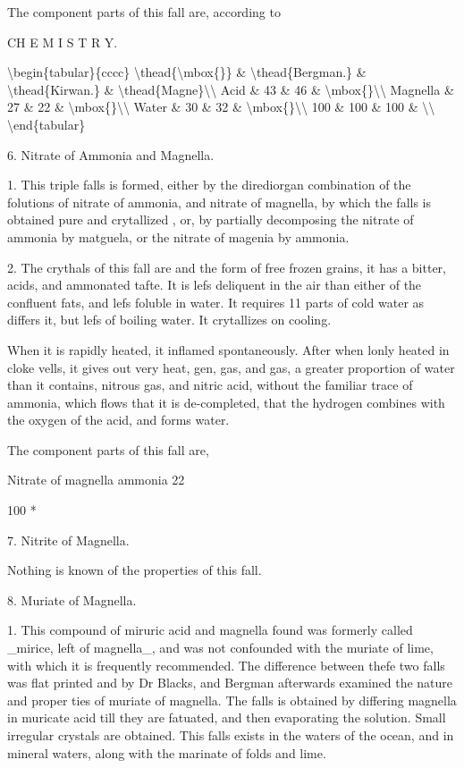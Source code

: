 \documentclass{article}
\begin{document}
The component parts of this fall are, according to

CH E M I S T R Y.

\textbackslash{}begin\{tabular\}\{cccc\}
\textbackslash{}thead\{\textbackslash{}mbox\{\}\} \& \textbackslash{}thead\{Bergman.\} \& \textbackslash{}thead\{Kirwan.\} \& \textbackslash{}thead\{Magne\}\textbackslash{}\textbackslash{}
Acid \& 43 \& 46 \& \textbackslash{}mbox\{\}\textbackslash{}\textbackslash{}
Magnella \& 27 \& 22 \& \textbackslash{}mbox\{\}\textbackslash{}\textbackslash{}
Water \& 30 \& 32 \& \textbackslash{}mbox\{\}\textbackslash{}\textbackslash{}
100 \& 100 \& 100 \& \textbackslash{}\textbackslash{}
\textbackslash{}end\{tabular\}

6. Nitrate of Ammonia and Magnella.

1. This triple falls is formed, either by the dirediorgan combination of the folutions of nitrate of ammonia, and nitrate of magnella, by which the falls is obtained pure and crytallized , or, by partially decomposing the nitrate of ammonia by matguela, or the nitrate of magenia by ammonia.

2. The crythals of this fall are and the form of free frozen grains, it has a bitter, acids, and ammonated tafte. It is lefs deliquent in the air than either of the confluent fats, and lefs foluble in water. It requires 11 parts of cold water as differs it, but lefs of boiling water. It crytallizes on cooling.

When it is rapidly heated, it inflamed spontaneously. After when lonly heated in cloke vells, it gives out very heat, gen, gas, and gas, a greater proportion of water than it contains, nitrous gas, and nitric acid, without the familiar trace of ammonia, which flows that it is de-completed, that the hydrogen combines with the oxygen of the acid, and forms water.

The component parts of this fall are,

Nitrate of magnella
ammonia 22

100 *

7. Nitrite of Magnella.

Nothing is known of the properties of this fall.

8. Muriate of Magnella.

1. This compound of miruric acid and magnella found was formerly called \_mirice, left of magnella\_, and was not confounded with the muriate of lime, with which it is frequently recommended. The difference between thefe two falls was flat printed and by Dr Blacks, and Bergman afterwards examined the nature and proper ties of muriate of magnella. The falls is obtained by differing magnella in muricate acid till they are fatuated, and then evaporating the solution. Small irregular crystals are obtained. This falls exists in the waters of the ocean, and in mineral waters, along with the marinate of folds and lime.
\end{document}
